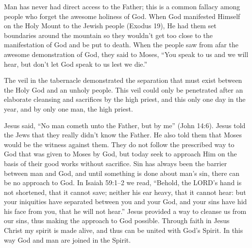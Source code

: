 Man has never had direct access to the Father; this is
a common fallacy among people who forget the awesome
holiness of God. When God manifested Himself on the Holy
Mount to the Jewish people (Exodus 19), He had them set
boundaries around the mountain so they wouldn’t get too
close to the manifestation of God and be put to death. When
the people saw from afar the awesome demonstration of
God, they said to Moses, “You speak to us and we will hear,
but don’t let God speak to us lest we die.”

The veil in the tabernacle demonstrated the separation
that must exist between the Holy God and an unholy
people. This veil could only be penetrated after an elaborate
cleansing and sacrifices by the high priest, and this only one
day in the year, and by only one man, the high priest.

Jesus said, “No man cometh unto the Father, but by me”
(John 14:6). Jesus told the Jews that they really didn’t know
the Father. He also told them that Moses would be the witness
against them. They do not follow the prescribed way
to God that was given to Moses by God, but today seek
to approach Him on the basis of their good works without
sacrifice. Sin has always been the barrier between man and
God, and until something is done about man’s sin, there can
be no approach to God. In Isaiah 59:1–2 we read, “Behold,
the LORD’s hand is not shortened, that it cannot save; neither
his ear heavy, that it cannot hear: but your iniquities
have separated between you and your God, and your sins
have hid his face from you, that he will not hear.” Jesus
provided a way to cleanse us from our sins, thus making
the approach to God possible. Through faith in Jesus Christ
my spirit is made alive, and thus can be united with God’s
Spirit. In this way God and man are joined in the Spirit.





